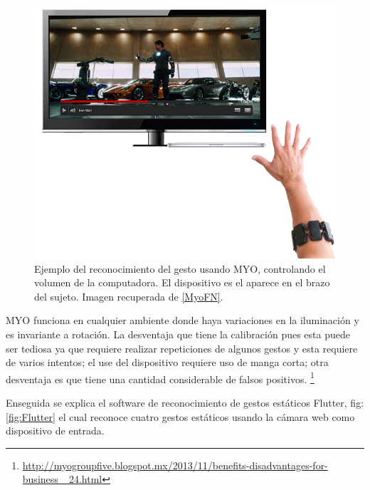 \begin{figure}[h!]
\begin{center}
\includegraphics[scale=.5]{./Figures/MYO.png}
\end{center}
\caption{Ejemplo del reconocimiento del gesto usando MYO, controlando el volumen de la computadora. El dispositivo es el aparece en el brazo del sujeto. Imagen recuperada de \ref{MyoFN}.}
\label{fig:Myo}
\end{figure}

MYO funciona en cualquier ambiente donde haya variaciones en la iluminación y es invariante a rotación. La desventaja que tiene la calibración pues esta puede ser tediosa ya que requiere realizar repeticiones de algunos gestos y esta requiere de varios intentos; el use del dispositivo requiere uso de manga corta; otra desventaja es que tiene una cantidad considerable de falsos positivos. \footnote{ \url{http://myogroupfive.blogspot.mx/2013/11/benefits-disadvantages-for-business\_ 24.html}} 


Enseguida se explica el software de reconocimiento de gestos estáticos Flutter, fig:\ref{fig:Flutter} el cual reconoce cuatro gestos estáticos usando la cámara web como dispositivo de entrada. 

